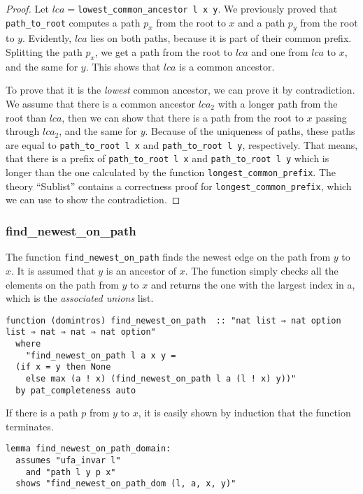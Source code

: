 \begin{proof}
Let $lca =$\lstinline{lowest_common_ancestor l x y}. We previously proved that \lstinline{path_to_root} computes a path $p_x$ from the root to $x$ and a path $p_y$ from the root to $y$. Evidently, $lca$ lies on both paths, because it is part of their common prefix. Splitting the path $p_x$, we get a path from the root to $lca$ and one from $lca$ to $x$, and the same for $y$. This shows that $lca$ is a common ancestor.

To prove that it is the \emph{lowest} common ancestor, we can prove it by contradiction. We assume that there is a common ancestor $lca_2$ with a longer path from the root than $lca$, then we can show that there is a path from the root to $x$ passing through $lca_2$, and the same for $y$. Because of the uniqueness of paths, these paths are equal to \lstinline{path_to_root l x} and \lstinline{path_to_root l y}, respectively. That means, that there is a prefix of \lstinline{path_to_root l x} and \lstinline{path_to_root l y} which is longer than the one calculated by the function \lstinline{longest_common_prefix}. The theory ``Sublist'' contains a correctness proof for \lstinline{longest_common_prefix}, which we can use to show the contradiction.
\end{proof}

\subsubsection{find\_newest\_on\_path}

The function \lstinline{find_newest_on_path} finds the newest edge on the path from $y$ to $x$. It is assumed that $y$ is an ancestor of $x$. The function simply checks all the elements on the path from $y$ to $x$ and returns the one with the largest index in a, which is the \emph{associated unions} list.

\begin{lstlisting}
function (domintros) find_newest_on_path  :: "nat list ⇒ nat option list ⇒ nat ⇒ nat ⇒ nat option"
  where
    "find_newest_on_path l a x y =
  (if x = y then None
    else max (a ! x) (find_newest_on_path l a (l ! x) y))"
  by pat_completeness auto
\end{lstlisting}

If there is a path $p$ from $y$ to $x$, it is easily shown by induction that the function terminates.

\begin{lstlisting}
lemma find_newest_on_path_domain:
  assumes "ufa_invar l"
    and "path l y p x"
  shows "find_newest_on_path_dom (l, a, x, y)"
\end{lstlisting}

